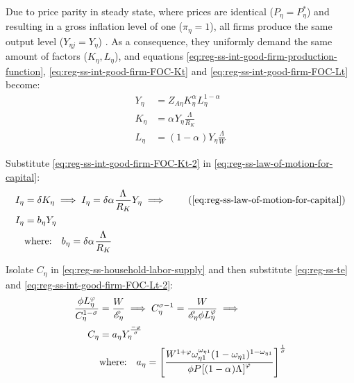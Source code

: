 \documentclass[../thesis.tex]{subfiles}
\begin{document}
Due to price parity in steady state, where prices are identical ($P_{\eta} = P_{\eta}^{\ast}$) and resulting in a gross inflation level of one ($\pi_{\eta} = 1$), all firms produce the same output level ($Y_{\eta j} = Y_{\eta}$) \cite[Lecture 13, p.12]{solis-garcia_ucb_2022}. As a consequence, they uniformly demand the same amount of factors ($K_{\eta}, L_{\eta}$), and equations \ref{eq:reg-ss-int-good-firm-production-function}, \ref{eq:reg-ss-int-good-firm-FOC-Kt} and \ref{eq:reg-ss-int-good-firm-FOC-Lt} become: %
\begin{align}
	Y_{\eta} &= Z_{A\eta} K_{\eta}^{\alpha_{}} L_{\eta}^{1 -{\alpha_{}}} \label{eq:reg-ss-int-good-firm-production-function-2} \\	
	K_{\eta} &= {\alpha_{}} Y_{\eta} \frac{\Lambda_{}}{R_K} \label{eq:reg-ss-int-good-firm-FOC-Kt-2} \\
	L_{\eta} &= (1-{\alpha_{}}) Y_{\eta} \frac{\Lambda_{}}{W} \label{eq:reg-ss-int-good-firm-FOC-Lt-2}
\end{align}
	
	Substitute \ref{eq:reg-ss-int-good-firm-FOC-Kt-2} in \ref{eq:reg-ss-law-of-motion-for-capital}:
	\begin{align}
		I_{\eta} &= \delta K_{\eta} \implies I_{\eta} = \delta {\alpha_{}} \frac{\Lambda_{}}{R_K} Y_{\eta} \implies \tag{\ref{eq:reg-ss-law-of-motion-for-capital}} \\
		I_{\eta} &= b_{\eta} Y_{\eta} \label{eq:reg-ss-investment} \\
		& \text{where:} \quad b_{\eta} = \delta {\alpha_{}} \frac{\Lambda_{}}{R_K} \label{eq:reg-ss-b-eta}
	\end{align}
	
	Isolate $C_{\eta}$ in \ref{eq:reg-ss-household-labor-supply} and then substitute \ref{eq:reg-ss-te} and \ref{eq:reg-ss-int-good-firm-FOC-Lt-2}:
	\begin{align}
		\frac{\phi L_{\eta}^{\varphi}}{C_{\eta}^{1-\sigma}} &= \frac{W}{\te[]} \implies C_{\eta}^{\sigma -1} = \frac{W}{\te[] \phi L_{\eta}^{\varphi}} \implies \nonumber\\
		C_{\eta} &= a_{\eta} Y_{\eta}^{\frac{-\varphi}{\sigma}} \label{eq:reg-ss-consumption} \\
		& \text{where:} \quad a_{\eta} = \left[ \frac{W^{1 +\varphi} \omega_{\eta 1}^{\omega_{\eta 1}} (1 -\omega_{\eta 1})^{1 -\omega_{\eta 1}}}{\phi P_{} \left[ (1 -\alpha_{}) \Lambda_{} \right]^{\varphi}} \right]^{\frac{1}{\sigma}} \label{eq:reg-ss-a-eta}
	\end{align}
\end{document}

